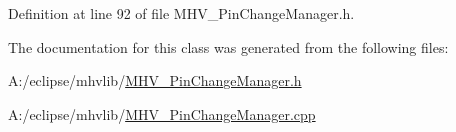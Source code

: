 \-Definition at line 92 of file \-M\-H\-V\-\_\-\-Pin\-Change\-Manager.\-h.



\-The documentation for this class was generated from the following files\-:\begin{DoxyCompactItemize}
\item 
\-A\-:/eclipse/mhvlib/\hyperlink{_m_h_v___pin_change_manager_8h}{\-M\-H\-V\-\_\-\-Pin\-Change\-Manager.\-h}\item 
\-A\-:/eclipse/mhvlib/\hyperlink{_m_h_v___pin_change_manager_8cpp}{\-M\-H\-V\-\_\-\-Pin\-Change\-Manager.\-cpp}\end{DoxyCompactItemize}

